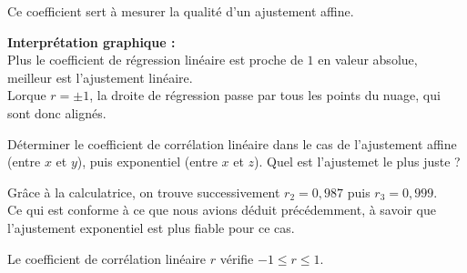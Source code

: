 \documentclass[french]{book}
\begin{document}
Ce coefficient sert à mesurer la qualité d'un ajustement affine.


\textbf{Interprétation graphique :} \\
Plus le coefficient de régression linéaire est proche de $1$ en valeur absolue, meilleur est l'ajustement linéaire. \\
Lorque $r=\pm1$, la droite de régression passe par tous les points du nuage, qui sont donc alignés.


\begin{exemple}
   Déterminer le coefficient de corrélation linéaire dans le cas de l'ajustement affine (entre $x$ et $y$), puis exponentiel (entre $x$ et $z$). Quel est l'ajustemet le plus juste ?
\end{exemple}

Grâce à la calculatrice, on trouve successivement $r_2=0,987$ puis $r_3=0,999$. \\
Ce qui est conforme à ce que nous avions déduit précédemment, à savoir que l'ajustement exponentiel est plus fiable pour ce cas.



\begin{prop}
   Le  coefficient de corrélation linéaire $r$ vérifie $-1\leq r\leq 1$.
\end{prop}

 
\end{document}
